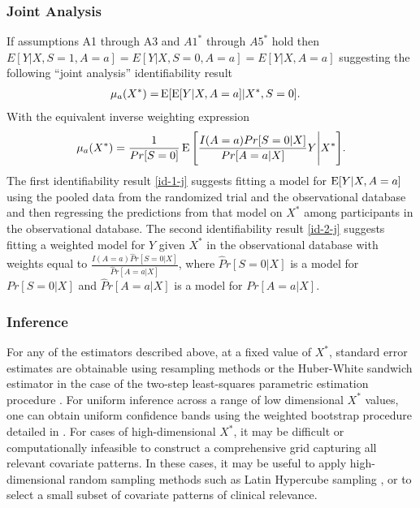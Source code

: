 \documentclass[11pt]{article}
\DeclareMathOperator{\E}{\textnormal{\mbox{E}}}
\begin{document}
\subsubsection*{Joint Analysis}
If assumptions A1 through A3 and $A1^*$ through $A5^*$ hold then $E[Y | X, S=1,A=a] = E[Y | X, S=0,A=a] = E[Y|X,A=a]$ suggesting the following ``joint analysis'' identifiability result
\begin{align}
 \mu_a(X^*) = & \E [\E[Y | X, A=a] |X^* , S=0]. \label{id-1-j} 
\end{align}
With the equivalent inverse weighting expression
\begin{align}
   \mu_a(X^*)= \frac{1}{Pr[S=0]} \E\Bigg[\frac{I(A=a) Pr[S=0|X]}{Pr[A=a|X]}   Y  \Bigg| X^* \Bigg]. \label{id-2-j}
\end{align}
The first identifiability result \eqref{id-1-j} suggests fitting a model for $\E[Y | X, A=a]$ using the pooled data from the randomized trial and the observational database and then regressing the predictions from that model on $X^*$ among participants in the observational database. The second identifiability result \eqref{id-2-j} suggests fitting a weighted model for $Y$ given $X^*$ in the observational database with weights equal to $\frac{I(A=a) \widehat Pr[S=0|X]}{\widehat Pr[A=a|X]}$, where $\widehat Pr[S=0|X]$ is a model for $Pr[S=0|X]$ and $\widehat Pr[A=a|X]$ is a model for $Pr[A=a|X]$.

\subsubsection*{Inference}
For any of the estimators described above, at a fixed value of $X^*$, standard error estimates are obtainable using resampling methods or the Huber-White sandwich estimator in the case of the two-step least-squares parametric estimation procedure  \cite{robertson_regression-based_2021, efron_introduction_1993, huber1967behavior}. For uniform inference across a range of low dimensional $X^*$ values, one can obtain uniform confidence bands using the weighted bootstrap procedure detailed in \cite{fan2021estimation}. For cases of high-dimensional $X^*$, it may be difficult or computationally infeasible to construct a comprehensive grid capturing all relevant covariate patterns.  In these cases, it may be useful to apply high-dimensional random sampling methods such as Latin Hypercube sampling \cite{mckay_latinhypercube}, or to select a small subset of covariate patterns of clinical relevance.


\end{document}
